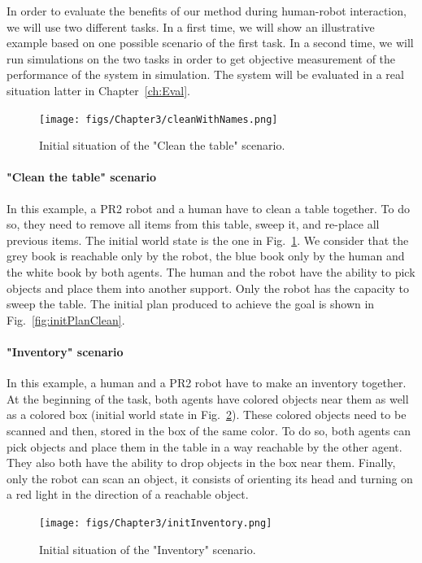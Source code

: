 \documentclass[english,a4paper,11pt,twoside]{StyleThese}
\begin{document}
In order to evaluate the benefits of our method during human-robot interaction, we will use two different tasks. In a first time, we will show an illustrative example based on one possible scenario of the first task. In a second time, we will run simulations on the two tasks in order to get objective measurement of the performance of the system in simulation. The system will be evaluated in a real situation latter in Chapter~\ref{ch:Eval}.

\begin{figure}[!h]
	\centering
    \texttt{[image: figs/Chapter3/cleanWithNames.png]}
    \caption{Initial situation of the "Clean the table" scenario.}
    \label{fig:initClean}
\end{figure}

\paragraph{"Clean the table" scenario}

In this example, a PR2 robot and a human have to clean a table together. To do so, they need to remove all items from this table, sweep it, and re-place all previous items. The initial world state is the one in Fig.~\ref{fig:initClean}. We consider that the grey book is reachable only by the robot, the blue book only by the human and the white book by both agents. The human and the robot have the ability to pick objects and place them into another support. Only the robot has the capacity to sweep the table. The initial plan produced to achieve the goal is shown in Fig.~\ref{fig:initPlanClean}.

\paragraph{"Inventory" scenario}

In this example, a human and a PR2 robot have to make an inventory together. At the beginning of the task, both agents have colored objects near them as well as a colored box (initial world state in Fig.~\ref{fig:initInventory}). These colored objects need to be scanned and then, stored in the box of the same color. To do so, both agents can pick objects and place them in the table in a way reachable by the other agent. They also both have the ability to drop objects in the box near them. Finally, only the robot can scan an object, it consists of orienting its head and turning on a red light in the direction of a reachable object. 

\begin{figure}[!h]
	\centering
    \texttt{[image: figs/Chapter3/initInventory.png]}
    \caption{Initial situation of the "Inventory" scenario.}
    \label{fig:initInventory}
\end{figure}
\end{document}

